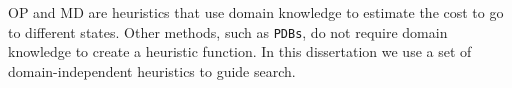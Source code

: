 OP and MD are heuristics that use domain knowledge to estimate the cost to go to different states. Other methods, such as \texttt{PDBs}, do not require domain knowledge to create a heuristic function. In this dissertation we use a set of domain-independent heuristics to guide search. 


%
%


